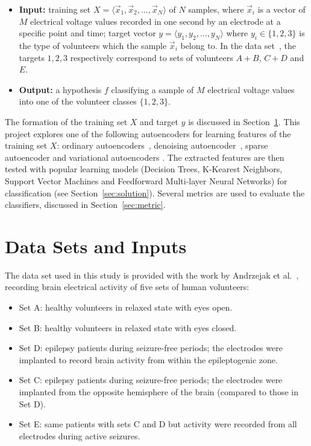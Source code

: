 \documentclass[12pt]{article}
\newcommand{\myvec}[1]{\vec{#1}}
\begin{document}
\begin{itemize}
\item \textbf{Input:} training set $X = \langle \myvec{x}_1, \myvec{x}_2, ..., \myvec{x}_N\rangle$ of $N$ samples, where $\myvec{x}_i$ is a vector of $M$ electrical voltage values recorded in one second by an electrode at a specific point and time; target vector $y = \langle y_1, y_2, ..., y_N \rangle$ where $y_i \in \{1, 2, 3\}$ is the type of volunteers which the sample $\myvec{x}_i$ belong to. In the data set~\cite{andrzejak2001indications}, the targets $1, 2, 3$ respectively correspond to sets of volunteers $A + B$, $C + D$ and $E$.
\item \textbf{Output:} a hypothesis $f$ classifying a sample of $M$ electrical voltage values into one of the volunteer classes $\{1, 2, 3\}$.
\end{itemize}

The formation of the training set $X$ and target $y$ is discussed in Section~\ref{sec:data_set}. This project explores one of the following autoencoders for learning features of the training set $X$: ordinary autoencoders~\cite{bengio2007greedy}, denoising autoencoder~\cite{vincent2010stacked}, sparse autoencoder\cite{boureau2008sparse} and variational autoencoders \cite{kingma2013auto}. The extracted features are then tested with popular learning models (Decision Trees, K-Kearest Neighbors, Support Vector Machines and Feedforward Multi-layer Neural Networks) for classification (see Section~\ref{sec:solution}). Several metrics are used to evaluate the classifiers, discussed in Section~\ref{sec:metric}.

\section{Data Sets and Inputs}
\label{sec:data_set}
The data set used in this study is provided with the work by Andrzejak et al.~\cite{andrzejak2001indications}, recording brain electrical activity of five sets of human volunteers:
\begin{itemize}
\item Set A: healthy volunteers in relaxed state with eyes open.
\item Set B: healthy volunteers in relaxed state with eyes closed.
\item Set D: epilepsy patients during seizure-free periods; the electrodes were implanted to record brain activity from within the epileptogenic zone.
\item Set C: epilepsy patients during seizure-free periods; the electrodes were implanted from the opposite hemisphere of the brain (compared to those in Set D).
\item Set E: same patients with sets C and D but activity were recorded from all electrodes during active seizures.
\end{itemize}
\end{document}
